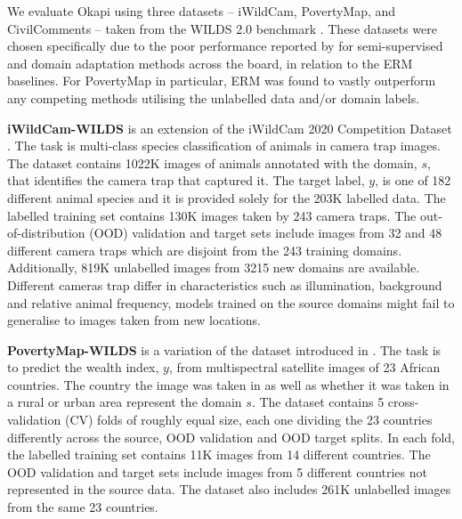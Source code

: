We evaluate Okapi using three datasets -- iWildCam, PovertyMap, and CivilComments -- taken from the
WILDS 2.0 benchmark
\citep{SagWeiLeeGaoetal22}.
%
These datasets were chosen specifically due to the poor performance reported by
\cite{SagWeiLeeGaoetal22} for semi-supervised and domain adaptation methods across the board, in
relation to the ERM baselines.
%
For PovertyMap in particular, ERM was found to vastly outperform any competing methods utilising
the unlabelled data and/or domain labels.


\textbf{iWildCam-WILDS} is an extension of the iWildCam 2020 Competition Dataset
\cite{beery2020iwildcam}. 
%
The task is multi-class species classification  of animals in camera trap images. The dataset
contains 1022K images of animals annotated with the domain, $s$, that identifies the camera trap
that captured it. The target label, $y$, is one of 182 different animal species and it is provided
solely for the 203K labelled data. The labelled training set contains 130K images taken by 243 camera traps. 
%
The out-of-distribution (OOD) validation and target sets include images from 32 and 48 different
camera traps which are disjoint from the 243 training domains.
%
Additionally, 819K unlabelled images from 3215 new domains are available. %
Different cameras trap differ in characteristics such as illumination, background and relative
animal frequency, models trained on the source domains might fail to generalise to images taken
from new locations.


\textbf{PovertyMap-WILDS} is a variation of the dataset introduced in 
\cite{yeh2020using}. The task is to predict the wealth index, $y$, from multispectral satellite
images of 23 African countries. The country the image was taken in as well as whether it was taken
in a rural or urban area represent the domain $s$. The dataset contains 5 cross-validation (CV)
folds of roughly equal size, each one dividing the 23 countries differently across the source, OOD
validation and OOD target splits. In each fold, the labelled training set contains 11K images from
14 different countries. The OOD validation and target sets include images from 5 different
countries not represented in the source data.
%
The dataset also includes 261K unlabelled images from the same 23 countries. 

